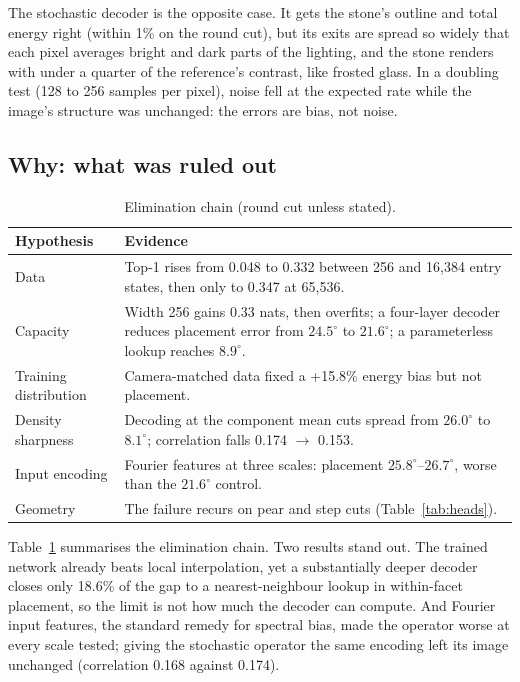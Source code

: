 \documentclass[conference]{IEEEtran}
\newcommand{\dg}{^{\circ}}
\begin{document}
The stochastic decoder is the opposite case. It gets the stone's outline and
total energy right (within 1\% on the round cut), but its exits are spread so
widely that each pixel averages bright and dark parts of the lighting, and the
stone renders with under a quarter of the reference's contrast, like frosted
glass. In a doubling test (128 to 256 samples per pixel), noise fell at the
expected rate while the image's structure was unchanged: the errors are bias,
not noise.

\subsection{Why: what was ruled out}

\begin{table}[t]
\caption{Elimination chain (round cut unless stated).}
\label{tab:elim}
\centering
\setlength{\tabcolsep}{3pt}
\begin{tabular}{@{}lp{56mm}@{}}
\toprule
Hypothesis & Evidence \\
\midrule
Data & Top-1 rises from 0.048 to 0.332 between 256 and 16,384 entry states, then only to 0.347 at 65,536. \\
Capacity & Width 256 gains 0.33 nats, then overfits; a four-layer decoder reduces placement error from $24.5\dg$ to $21.6\dg$; a parameterless lookup reaches $8.9\dg$. \\
Training distribution & Camera-matched data fixed a +15.8\% energy bias but not placement. \\
Density sharpness & Decoding at the component mean cuts spread from $26.0\dg$ to $8.1\dg$; correlation falls 0.174 $\to$ 0.153. \\
Input encoding & Fourier features \cite{tancik2020} at three scales: placement $25.8\dg$--$26.7\dg$, worse than the $21.6\dg$ control. \\
Geometry & The failure recurs on pear and step cuts (Table~\ref{tab:heads}). \\
\bottomrule
\end{tabular}
\end{table}

Table~\ref{tab:elim} summarises the elimination chain. Two results stand out.
The trained network already beats local interpolation, yet a substantially
deeper decoder closes only 18.6\% of the gap to a nearest-neighbour lookup in
within-facet placement, so the limit is not how much the decoder can compute.
And Fourier input features, the standard remedy for spectral bias, made the
operator worse at every scale tested; giving the stochastic operator the same
encoding left its image unchanged (correlation 0.168 against 0.174).
\end{document}
